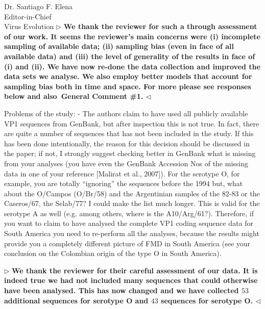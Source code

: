 \documentclass[ucla,biomath,12pt,noaddrfooter,datefrom]{UC_letter}
\newenvironment{reply}{$\triangleright$\bf}{$\triangleleft$}
\begin{document}
\begin{letter}{
Dr. Santiago F. Elena \\
Editor-in-Chief \\
Virus Evolution
}
\begin{reply}
We thank the reviewer for such a through assessment of our work.
It seems the reviewer's main concerns were (i) incomplete sampling of available data; (ii) sampling bias (even in face of all available data) and (iii) the level of generality of the results in face of (i) and (ii).
We have now re-done the data collection and improved the data sets we analyse.
We also employ better models that account for sampling bias both in time and space.
For more please see responses below and also~\textbf{General Comment \#1}.
\end{reply}

Problems of the study:
-       The authors claim to have used all publicly available VP1 sequences from GenBank, but after inspection this is not true. 
In fact, there are quite a number of sequences that has not been included in the study. If this has been done intentionally, the reason for this decision should be discussed in the paper; if not, I strongly suggest checking better in GenBank what is missing from your analyses (you have even the GenBank Accession Nos of the missing data in one of your reference [Malirat et al., 2007]). 
For the serotype O, for example, you are totally ``ignoring'' the sequences before the 1994 but, what about the O/Campos (O/Br/58) and the Argentinian samples of the 82-83 or the Caseros/67, the Selab/77? I could make the list much longer. 
This is valid for the serotype A as well (e.g. among others, where is the A10/Arg/61?). 
Therefore, if you want to claim to have analysed the complete VP1 coding sequence data for South America you need to re-perform all the analyses, because the results might provide you a completely different picture of FMD in South America (see your conclusion on the Colombian origin of the type O in South America).

\begin{reply}
We thank the reviewer for their careful assessment of our data.
It is indeed true we had not included many sequences that could otherwise have been analysed.
This has now changed and we have collected $53$ additional sequences for serotype O and $43$ sequences for serotype O.
\end{reply}


\end{letter}
\end{document}
